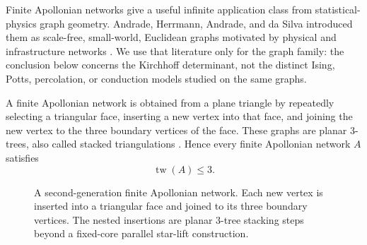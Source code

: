 \documentclass[preprint,12pt,authoryear]{elsarticle}
\numberwithin{equation}{section}
\theoremstyle{definition}
\theoremstyle{remark}
\newcommand{\1}{\mathbf{1}}
\newcommand{\tw}{\operatorname{tw}}
\begin{document}
Finite Apollonian networks give a useful infinite application class from statistical-physics graph geometry.  Andrade, Herrmann, Andrade, and da Silva introduced them as scale-free, small-world, Euclidean graphs motivated by physical and infrastructure networks \cite{AndradeHerrmannAndradeDaSilva2005}.  We use that literature only for the graph family: the conclusion below concerns the Kirchhoff determinant, not the distinct Ising, Potts, percolation, or conduction models studied on the same graphs.

A finite Apollonian network is obtained from a plane triangle by repeatedly selecting a triangular face, inserting a new vertex into that face, and joining the new vertex to the three boundary vertices of the face.  These graphs are planar \(3\)-trees, also called stacked triangulations \cite{BergoldEtAl2024}.  Hence every finite Apollonian network \(A\) satisfies
\begin{equation}
        \tw(A)\le3.
\end{equation}

\begin{figure}[h!]
\centering
{}
\caption{A second-generation finite Apollonian network.  Each new vertex is inserted into a triangular face and joined to its three boundary vertices.  The nested insertions are planar \(3\)-tree stacking steps beyond a fixed-core parallel star-lift construction.}
\label{fig:apollonian-network}
\end{figure}
\end{document}
